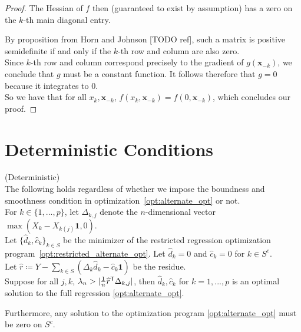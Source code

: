 \documentclass{article}
\begin{document}
\begin{proof}
The Hessian of $f$ then (guaranteed to exist by assumption) has a zero on the $k$-th main diagonal entry. 

By proposition from Horn and Johnson [TODO ref], such a matrix is positive semidefinite if and only if the $k$-th row and column are also zero. \\

Since $k$-th row and column correspond precisely to the gradient of $g(\mathbf{x}_{-k})$, we conclude that $g$ must be a constant function. It follows therefore that $g = 0$ because it integrates to 0. \\

So we have that for all $x_k, \mathbf{x}_{-k}$, $f(x_k, \mathbf{x}_{-k}) = f(0, \mathbf{x}_{-k})$, which concludes our proof.

\end{proof}








\section{Deterministic Conditions}

\begin{theorem} (Deterministic) \\
The following holds regardless of whether we impose the boundness and smoothness condition in optimization~\ref{opt:alternate_opt} or not.\\

For $k \in \{1,...,p\}$, let $\Delta_{k, j}$ denote the $n$-dimensional vector $\max( X_k - X_{k (j)} \mathbf{1}, 0)$. \\

Let $\{\hat{d}_k, \hat{c}_k \}_{k \in S}$ be the minimizer of the restricted regression optimization program~\ref{opt:restricted_alternate_opt}. 
Let $\hat{d}_k = 0$ and $ \hat{c}_k = 0$ for $k \in S^c$.\\

Let $\hat{r} \coloneqq Y - \sum_{k \in S} (\Delta_k \hat{d}_k - \hat{c}_k \mathbf{1})$ be the residue.\\

Suppose for all $j,k$, $\lambda_n > | \frac{1}{n} \widehat{r}^{\mathsf{T}} \Delta_{k,j}|$, then $\hat{d}_k, \hat{c}_k$ for $k=1,...,p$ is an optimal solution to the full regression \ref{opt:alternate_opt}.

Furthermore, any solution to the optimization program \ref{opt:alternate_opt} must be zero on $S^c$.
\end{theorem}
\end{document}
